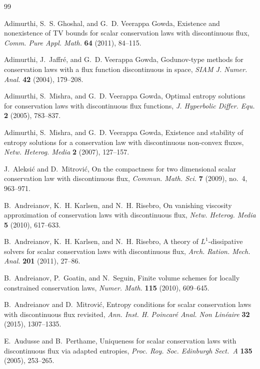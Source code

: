 \documentclass[11pt]{amsart}
\numberwithin{equation}{section}
\theoremstyle{plain}
\theoremstyle{definition}
\theoremstyle{remark}
\begin{document}
\begin{thebibliography}{99}

Adimurthi, S.~S. Ghoshal, and G.~D. Veerappa Gowda,
Existence and nonexistence of TV bounds for scalar conservation laws with discontinuous flux,
\emph{Comm. Pure Appl. Math.} \textbf{64} (2011), 84--115.

Adimurthi, J.~Jaffr\'e, and G.~D. Veerappa Gowda,
Godunov-type methods for conservation laws with a flux function discontinuous in space,
\emph{SIAM J. Numer. Anal.} \textbf{42} (2004), 179--208.

Adimurthi, S.~Mishra, and G.~D. Veerappa Gowda,
Optimal entropy solutions for conservation laws with discontinuous flux functions,
\emph{J. Hyperbolic Differ. Equ.} \textbf{2} (2005), 783--837.

Adimurthi, S.~Mishra, and G.~D. Veerappa Gowda,
Existence and stability of entropy solutions for a conservation law with discontinuous non-convex fluxes,
\emph{Netw. Heterog. Media} \textbf{2} (2007), 127--157.

J.~Aleksi\'c and D.~Mitrovi\'c,
On the compactness for two dimensional scalar conservation law with discontinuous flux,
\emph{Commun. Math. Sci.} \textbf{7} (2009), no.~4, 963--971.

B.~Andreianov, K.~H. Karlsen, and N.~H. Risebro,
On vanishing viscosity approximation of conservation laws with discontinuous flux,
\emph{Netw. Heterog. Media} \textbf{5} (2010), 617--633.

B.~Andreianov, K.~H. Karlsen, and N.~H. Risebro,
A theory of \(L^1\)-dissipative solvers for scalar conservation laws with discontinuous flux,
\emph{Arch. Ration. Mech. Anal.} \textbf{201} (2011), 27--86.

B.~Andreianov, P.~Goatin, and N.~Seguin,
Finite volume schemes for locally constrained conservation laws,
\emph{Numer. Math.} \textbf{115} (2010), 609--645.

B.~Andreianov and D.~Mitrovi\'c,
Entropy conditions for scalar conservation laws with discontinuous flux revisited,
\emph{Ann. Inst. H. Poincar\'e Anal. Non Lin\'eaire} \textbf{32} (2015), 1307--1335.

E.~Audusse and B.~Perthame,
Uniqueness for scalar conservation laws with discontinuous flux via adapted entropies,
\emph{Proc. Roy. Soc. Edinburgh Sect.~A} \textbf{135} (2005), 253--265.


\end{thebibliography}
\end{document}
